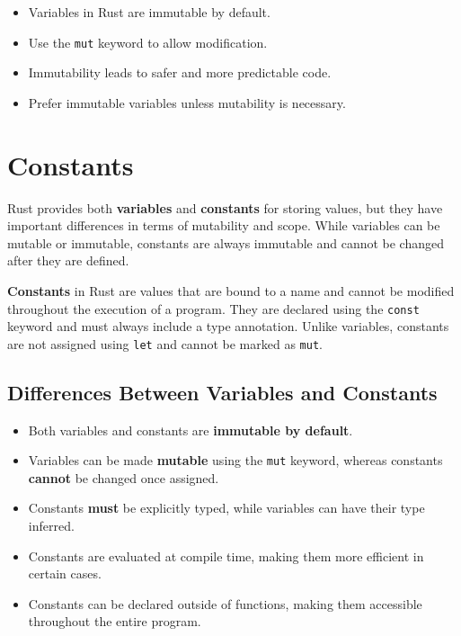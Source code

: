 \documentclass[a4paper,12pt]{report}
\begin{document}
	
	\begin{takeawaybox}
		\begin{itemize}
			\item Variables in Rust are immutable by default.
			\item Use the \texttt{mut} keyword to allow modification.
			\item Immutability leads to safer and more predictable code.
			\item Prefer immutable variables unless mutability is necessary.
		\end{itemize}
		
	\end{takeawaybox}
	
\section{Constants}
	Rust provides both \textbf{variables} and \textbf{constants} for storing values, but they have important differences in terms of mutability and scope. While variables can be mutable or immutable, constants are always immutable and cannot be changed after they are defined.
	

\vspace{0.2cm}
		\noindent \textbf{Constants} in Rust are values that are bound to a name and cannot be modified throughout the execution of a program. They are declared using the \texttt{const} keyword and must always include a type annotation. Unlike variables, constants are not assigned using \texttt{let} and cannot be marked as \texttt{mut}. 
	
	\subsection*{Differences Between Variables and Constants}
	\begin{itemize}
		\item Both variables and constants are \textbf{immutable by default}.
		\item Variables can be made \textbf{mutable} using the \texttt{mut} keyword, whereas constants \textbf{cannot} be changed once assigned.
		\item Constants \textbf{must} be explicitly typed, while variables can have their type inferred.
		\item Constants are evaluated at compile time, making them more efficient in certain cases.
		\item Constants can be declared outside of functions, making them accessible throughout the entire program.
	\end{itemize}
	
\end{document}
